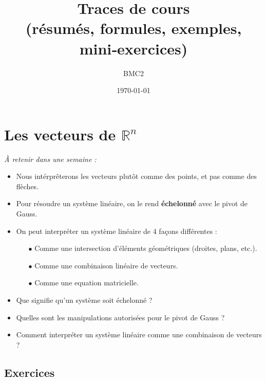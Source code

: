\documentclass[11pt,a4paper]{report}
\title{\textbf{Traces de cours}\\\large (résumés, formules, exemples, mini‑exercices)}
\author{ BMC2 }
\date{\today}
\newenvironment{niceitemize}{\begin{itemize}\setlength{\itemsep}{0.25em}\color{Gray}}{\end{itemize}}
\begin{document}
\tableofcontents
\clearpage


\chapter{Les vecteurs de $\mathbb{R}^n$}

  \begin{resumeBox}
    \emph{À retenir dans une semaine :} 
    \begin{niceitemize}
      \item Nous intérprêterons les vecteurs plutôt comme des points, et pas comme des flèches.
      \item Pour résoudre un système linéaire, on le rend \textbf{échelonné} avec le pivot de Gauss.
      \item On peut interpréter un système linéaire de 4 façons différentes : 
        \begin{itemize}
          \item[$\bullet$] Comme une intersection d'éléments géométriques (droites, plans, etc.).
          \item[$\bullet$] Comme une combinaison linéaire de vecteurs.
          \item[$\bullet$] Comme une equation matricielle.
        \end{itemize}
    \end{niceitemize}
  \end{resumeBox}
  \begin{rappelsBox}
    \begin{niceitemize}
      \item Que signifie qu'un système soit échelonné ?
      \item Quelles sont les manipulations autorisées pour le pivot de Gauss ?
      \item Comment interpréter un système linéaire comme une combinaison de vecteurs ?
    \end{niceitemize}
  \end{rappelsBox}

\section{Exercices}
\end{document}
